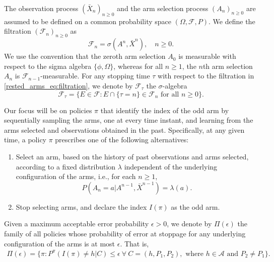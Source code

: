 The observation process $(\bar{X}_n)_{n\geq 0}$ and the arm selection process $(A_n)_{n\geq 0}$ are assumed to be defined on a common probability space $(\Omega,\mathcal{F},P)$. We define the filtration $(\mathcal{F}_n)_{n\geq 0}$ as
\begin{equation}
	\mathcal{F}_n = \sigma(A^n,\bar{X}^n),\quad n\geq 0.
	\label{rested_arms_eq:filtration}
\end{equation}
We use the convention that the zeroth arm selection $A_0$ is measurable with respect to the sigma algebra $\{\phi,\Omega\}$, whereas for all $n\geq 1$, the $n$th arm selection $A_n$ is $\mathcal{F}_{n-1}$-measurable.
For any stopping time $\tau$ with respect to the filtration in \eqref{rested_arms_eq:filtration}, we denote by $\mathcal{F}_{\tau}$ the $\sigma$-algebra
\begin{equation}
	\mathcal{F}_{\tau}=\{E\in\mathcal{F}:E\cap \{\tau=n\}\in\mathcal{F}_{n}\text{ for all }n\geq 0\}.\label{rested_arms_eq:stopping_time_sigma_alg}
\end{equation}

Our focus will be on policies $\pi$ that identify the index of the odd arm by sequentially sampling the arms, one at every time instant, and learning from the arms selected and observations obtained in the past. Specifically, at any given time, a policy $\pi$ prescribes one of the following alternatives:
\begin{enumerate}
\item Select an arm, based on the history of past observations and arms selected, according to a fixed distribution $\lambda$ independent of the underlying configuration of the arms, i.e., for each $n\geq 1$,
\begin{equation}
P(A_{n}=a|A^{n-1},\bar{X}^{n-1})=\lambda(a).	\label{rested_arms_eq:lambda(a)}
\end{equation}
\item Stop selecting arms, and declare the index $I(\pi)$ as the odd arm.	
\end{enumerate}
 Given a maximum acceptable error probability $\epsilon>0$, we denote by $\Pi(\epsilon)$ the family of all policies whose probability of error at stoppage for any underlying configuration of the arms is at most $\epsilon$. That is,
\begingroup\allowdisplaybreaks\begin{align}
	\Pi(\epsilon)=\bigg\lbrace\pi:P^\pi(I(\pi)\neq h|C)\leq \epsilon~\forall~ C=(h,P_1,P_2),\text{ where }h\in\mathcal{A}\text{ and }P_2\neq P_1\bigg\rbrace.\label{rested_arms_eq:Pi(epsilon)}
\end{align}\endgroup

